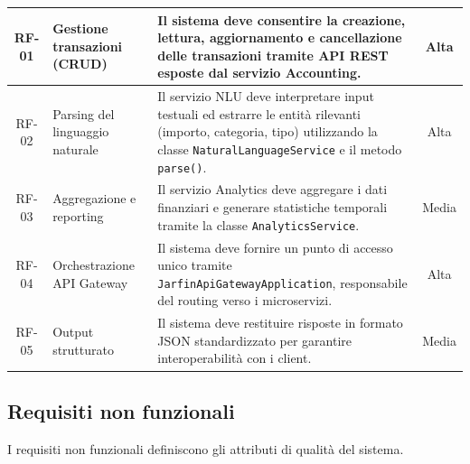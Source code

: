 \begin{small}
\begin{longtable}{|c|p{4cm}|p{6cm}|c|}
        RF-01       & Gestione transazioni (CRUD)     & Il sistema deve consentire la creazione, lettura, aggiornamento e cancellazione delle transazioni tramite API REST esposte dal servizio Accounting.                                             & Alta              \\ \hline
        RF-02       & Parsing del linguaggio naturale & Il servizio NLU deve interpretare input testuali ed estrarre le entità rilevanti (importo, categoria, tipo) utilizzando la classe \texttt{NaturalLanguageService} e il metodo \texttt{parse()}. & Alta              \\ \hline
        RF-03       & Aggregazione e reporting        & Il servizio Analytics deve aggregare i dati finanziari e generare statistiche temporali tramite la classe \texttt{AnalyticsService}.                                                              & Media             \\ \hline
        RF-04       & Orchestrazione API Gateway      & Il sistema deve fornire un punto di accesso unico tramite \texttt{JarfinApiGatewayApplication}, responsabile del routing verso i microservizi.                                                                   & Alta              \\ \hline
        RF-05       & Output strutturato              & Il sistema deve restituire risposte in formato JSON standardizzato per garantire interoperabilità con i client.                                                                                 & Media             \\ \hline
    \end{longtable}
\end{small}

\subsection{Requisiti non funzionali}

I requisiti non funzionali definiscono gli attributi di qualità del sistema.

